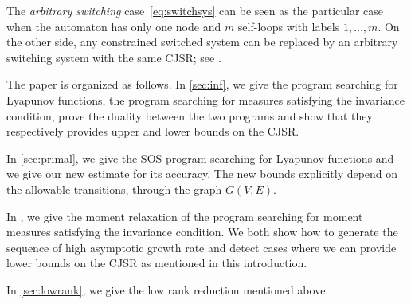 







The \emph{arbitrary switching} case~\eqref{eq:switchsys}
can be seen as the particular case when the automaton has only one node and $m$ self-loops with labels $1, \ldots, m$.
On the other side, any constrained switched system can be replaced by an arbitrary switching system with the same CJSR; see .





The paper is organized as follows.
In \Sect\ref{sec:inf}, we give the program searching for Lyapunov functions,
the program searching for measures satisfying the invariance condition,
prove the duality between the two programs
and show that they respectively provides upper and lower bounds on the CJSR.

In \Sect\ref{sec:primal}, we give the SOS program searching for Lyapunov functions and
we give our new estimate for its accuracy.
The new bounds explicitly depend on the allowable transitions, through
the graph $G(V,E)$.

In , we give the moment relaxation of the program searching for moment measures satisfying the invariance condition.
We both show how to generate the sequence of high asymptotic growth rate and detect cases where
we can provide lower bounds on the CJSR as mentioned in this introduction.

In \Sect\ref{sec:lowrank}, we give the low rank reduction mentioned above.
